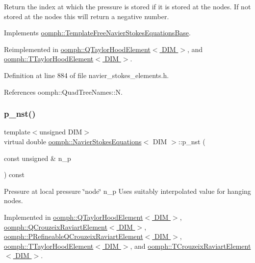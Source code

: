 Return the index at which the pressure is stored if it is stored at the nodes. If not stored at the nodes this will return a negative number. 



Implements \hyperlink{classoomph_1_1TemplateFreeNavierStokesEquationsBase_a58c5bba4a2cef9dc6cb0835104ef1c06}{oomph\+::\+Template\+Free\+Navier\+Stokes\+Equations\+Base}.



Reimplemented in \hyperlink{classoomph_1_1QTaylorHoodElement_a86f85131d3383d74ab40dfdb2213d8d5}{oomph\+::\+Q\+Taylor\+Hood\+Element$<$ D\+I\+M $>$}, and \hyperlink{classoomph_1_1TTaylorHoodElement_abbf584f29e53f15d5b0b263882138eac}{oomph\+::\+T\+Taylor\+Hood\+Element$<$ D\+I\+M $>$}.



Definition at line 884 of file navier\+\_\+stokes\+\_\+elements.\+h.



References oomph\+::\+Quad\+Tree\+Names\+::N.

\mbox{\label{classoomph_1_1NavierStokesEquations_ae00a22f99df3630b3ab751a4453a7fd8}} 
\subsubsection{\texorpdfstring{p\+\_\+nst()}{p\_nst()}\hspace{0.1cm}{\footnotesize\ttfamily [1/2]}}
{\footnotesize\ttfamily template$<$unsigned D\+IM$>$ \\
virtual double \hyperlink{classoomph_1_1NavierStokesEquations}{oomph\+::\+Navier\+Stokes\+Equations}$<$ D\+IM $>$\+::p\+\_\+nst (\begin{DoxyParamCaption}\item[{const unsigned \&}]{n\+\_\+p }\end{DoxyParamCaption}) const\hspace{0.3cm}{\ttfamily [pure virtual]}}



Pressure at local pressure \char`\"{}node\char`\"{} n\+\_\+p Uses suitably interpolated value for hanging nodes. 



Implemented in \hyperlink{classoomph_1_1QTaylorHoodElement_a533ae120f2cde3e5d589b76c08803f09}{oomph\+::\+Q\+Taylor\+Hood\+Element$<$ D\+I\+M $>$}, \hyperlink{classoomph_1_1QCrouzeixRaviartElement_a3d3b2f685b66899fa0d56745bf5043d9}{oomph\+::\+Q\+Crouzeix\+Raviart\+Element$<$ D\+I\+M $>$}, \hyperlink{classoomph_1_1PRefineableQCrouzeixRaviartElement_a2a9613cf21e1d115893491423ca5394a}{oomph\+::\+P\+Refineable\+Q\+Crouzeix\+Raviart\+Element$<$ D\+I\+M $>$}, \hyperlink{classoomph_1_1TTaylorHoodElement_aabf332af5cb1c937251466fbb1cb7274}{oomph\+::\+T\+Taylor\+Hood\+Element$<$ D\+I\+M $>$}, and \hyperlink{classoomph_1_1TCrouzeixRaviartElement_a4d3fd2e4d1da1daa9cf53bad6495040e}{oomph\+::\+T\+Crouzeix\+Raviart\+Element$<$ D\+I\+M $>$}.

